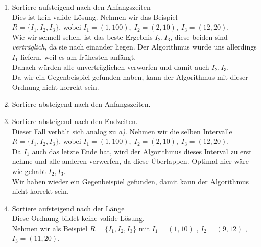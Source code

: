 \documentclass[11pt,a4paper,ngerman]{article}
\begin{document}
\begin{enumerate}[\bfseries (a)]


\item Sortiere aufsteigend nach den Anfangszeiten\\

Dies ist kein valide Lösung. Nehmen wir das Beispiel\\
$R = \{ I_1, I_2, I_3 \}$, wobei $I_1 = (1, 100), \; I_2 = (2, 10), \; I_3 = (12 , 20)$.\\

Wie wir schnell sehen, ist das beste Ergebnis $I_2, I_3$, diese beiden sind \emph{verträglich}, da sie nach einander liegen. Der Algorithmus würde uns allerdings $I_1$ liefern, weil es am frühesten anfängt.\\
Danach würden alle unverträglichen verworfen und damit auch $I_2, I_3$.\\

Da wir ein Gegenbeispiel gefunden haben, kann der Algorithmus mit dieser Ordnung nicht korrekt sein.

\item Sortiere absteigend nach den Anfangszeiten.


\item Sortiere absteigend nach den Endzeiten.\\

Dieser Fall verhält sich analog zu \emph{a)}.  Nehmen wir die selben Intervalle $R = \{ I_1, I_2, I_3 \}$, wobei $I_1 = (1, 100), \; I_2 = (2, 10), \; I_3 = (12 , 20)$.\\

Da $I_1$ auch das letzte Ende hat, wird der Algorithmus dieses Interval zu erst nehme und alle anderen verwerfen, da diese Überlappen. Optimal hier wäre wie gehabt $I_2, I_3$.\\

Wir haben wieder ein Gegenbeispiel gefunden, damit kann der Algorithmus nicht korrekt sein.

\item Sortiere aufsteigend nach der Länge\\

Diese Ordnung bildet keine valide Lösung.\\
Nehmen wir als Beispiel $R = \{ I_1 , I_2 , I_3\}$ mit $I_1 = (1,10)$ , $I_2 = (9,12)$ , $I_3 = (11,20)$.\\


\end{enumerate}
\end{document}
